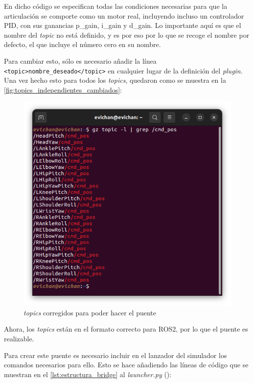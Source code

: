 En dicho código se especifican todas las condiciones necesarias para que la articulación se comporte como un motor real, incluyendo incluso un controlador PID, con sus ganancias p\_gain, i\_gain y d\_gain. Lo importante aquí es que el nombre del \textit{topic} no está definido, y es por eso por lo que se recoge el nombre por defecto, el que incluye el número cero en su nombre.

Para cambiar esto, sólo es necesario añadir la línea \texttt{<topic>nombre\_deseado</topic>} en cualquier lugar de la definición del \textit{plugin}. Una vez hecho esto para todos los \textit{topics}, quedaron como se muestra en la \autoref{fig:topics_independientes_cambiados}:

\begin{figure}[H]
  \centering
  \includegraphics[width=1\textwidth]{figures/cap_4/topics_gazebo_cambiados.png}
  \caption{\textit{topics} corregidos para poder hacer el puente}
  \label{fig:topics_independientes_cambiados}
\end{figure}

Ahora, los \textit{topics} están en el formato correcto para ROS2, por lo que el puente es realizable.

Para crear este puente es necesario incluir en el lanzador del simulador los comandos necesarios para ello. Esto se hace añadiendo las líneas de código que se muestran en el \autoref{lst:estructura_bridge} al \textit{launcher.py} (\cite{tutorial_bridge}):

